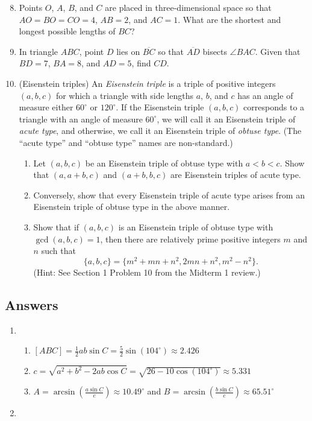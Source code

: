 \begin{enumerate}\setcounter{enumi}{7}
\item Points $O$, $A$, $B$, and $C$ are placed in three-dimensional space so that $AO = BO = CO = 4$, $AB = 2$, and $AC = 1$. What are the shortest and longest possible lengths of $BC$?
\item In triangle $ABC$, point $D$ lies on $\overline{BC}$ so that $\overline{AD}$ bisects $\angle BAC$. Given that $BD = 7$, $BA = 8$, and $AD = 5$, find $CD$.
\item (Eisenstein triples) An \emph{Eisenstein triple} is a triple of positive integers $(a,b,c)$ for which a triangle with side lengths $a$, $b$, and $c$ has an angle of measure either $60^{\circ}$ or $120^{\circ}$. If the Eisenstein triple $(a,b,c)$ corresponds to a triangle with an angle of measure $60^{\circ}$, we will call it an Eisenstein triple of \emph{acute type}, and otherwise, we call it an Eisenstein triple of \emph{obtuse type}. (The ``acute type'' and ``obtuse type'' names are non-standard.)
\begin{enumerate}
\item Let $(a,b,c)$ be an Eisenstein triple of obtuse type with $a < b < c$. Show that $(a, a + b, c)$ and $(a + b, b, c)$ are Eisenstein triples of acute type.
\item Conversely, show that every Eisenstein triple of acute type arises from an Eisenstein triple of obtuse type in the above manner.
\item Show that if $(a,b,c)$ is an Eisenstein triple of obtuse type with $\gcd(a,b,c) = 1$, then there are relatively prime positive integers $m$ and $n$ such that
\begin{equation*}
\{a,b,c\} = \{m^2 + mn + n^2, 2mn + n^2, m^2 - n^2\}.
\end{equation*}
(Hint: See Section 1 Problem 10 from the Midterm 1 review.)
\end{enumerate}
\end{enumerate}


\newpage
\subsection{Answers}

\begin{enumerate}
\item \begin{enumerate}
\item $[ABC] = \frac{1}{2}ab\sin C = \frac{5}{2}\sin(104^{\circ})\approx 2.426$
\item $c = \sqrt{a^2 + b^2 - 2ab\cos C} = \sqrt{26 - 10\cos(104^{\circ})}\approx 5.331$
\item $A = \arcsin(\frac{a\sin C}{c})\approx 10.49^{\circ}$ and $B = \arcsin(\frac{b\sin C}{c})\approx 65.51^{\circ}$
\end{enumerate}
\item 
\end{enumerate}